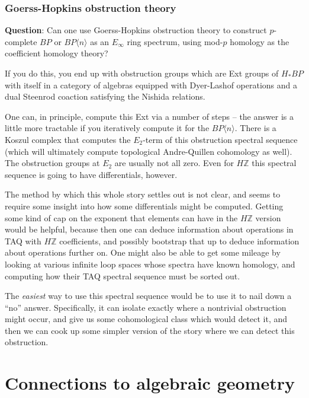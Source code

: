 \documentclass[12pt,titlepage]{article}
\theoremstyle{plain}
\theoremstyle{definition}
\theoremstyle{remark}
\begin{document}
\hypertarget{goersshopkins_obstruction_theory_15}{}\subsubsection{{Goerss-Hopkins obstruction theory}}\label{goersshopkins_obstruction_theory_15}

\textbf{Question}: Can one use Goerss-Hopkins obstruction theory to construct $p$-complete $BP$ or $BP\langle n\rangle$ as an $E_\infty$ ring spectrum, using mod-$p$ homology as the coefficient homology theory?

If you do this, you end up with obstruction groups which are Ext groups of $H_* BP$ with itself in a category of algebras equipped with Dyer-Lashof operations and a dual Steenrod coaction satisfying the Nishida relations.

One can, in principle, compute this Ext via a number of steps --{} the answer is a little more tractable if you iteratively compute it for the $BP\langle n\rangle$. There is a Koszul complex that computes the $E_2$-term of this obstruction spectral sequence (which will ultimately compute topological Andre-Quillen cohomology as well). The obstruction groups at $E_2$ are usually not all zero. Even for $H\mathbb{Z}$ this spectral sequence is going to have differentials, however.

The method by which this whole story settles out is not clear, and seems to require some insight into how some differentials might be computed. Getting some kind of cap on the exponent that elements can have in the $H\mathbb{Z}$ version would be helpful, because then one can deduce information about operations in TAQ with $H\mathbb{Z}$ coefficients, and possibly bootstrap that up to deduce information about operations further on. One might also be able to get some mileage by looking at various infinite loop spaces whose spectra have known homology, and computing how their TAQ spectral sequence must be sorted out.

The \emph{easiest} way to use this spectral sequence would be to use it to nail down a ``{}no''{} answer. Specifically, it can isolate exactly where a nontrivial obstruction might occur, and give us some cohomological class which would detect it, and then we can cook up some simpler version of the story where we can detect this obstruction.

\section{Connections to algebraic geometry}
\end{document}
